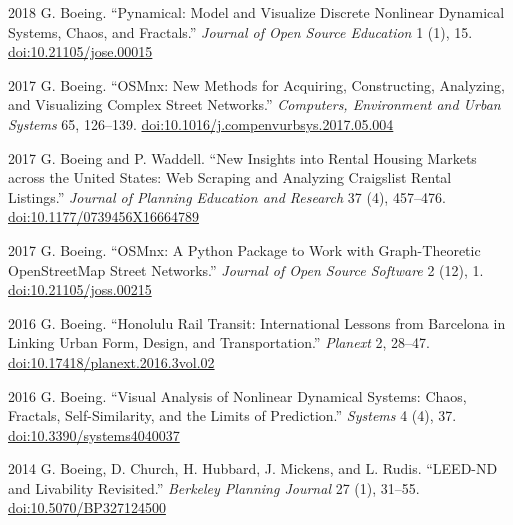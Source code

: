 \documentclass[11pt,letterpaper]{report} %
\begin{document}
\begin{tablist}
        \item[2018] \tab{}G. Boeing. \enquote{Pynamical: Model and Visualize Discrete Nonlinear Dynamical Systems, Chaos, and Fractals.} \textit{Journal of Open Source Education} 1 (1), 15. \href{https://doi.org/10.21105/jose.00015}{doi:10.21105/jose.00015}

        \item[2017] \tab{}G. Boeing. \enquote{OSMnx: New Methods for Acquiring, Constructing, Analyzing, and Visualizing Complex Street Networks.} \textit{Computers, Environment and Urban Systems} 65, 126--139. \href{https://doi.org/10.1016/j.compenvurbsys.2017.05.004}{doi:10.1016/j.compenvurbsys.2017.05.004}

        \item[2017] \tab{}G. Boeing and P. Waddell. \enquote{New Insights into Rental Housing Markets across the United States: Web Scraping and Analyzing Craigslist Rental Listings.} \textit{Journal of Planning Education and Research} 37 (4), 457--476. \href{https://doi.org/10.1177/0739456X16664789}{doi:10.1177/0739456X16664789}

        \item[2017] \tab{}G. Boeing. \enquote{OSMnx: A Python Package to Work with Graph-Theoretic OpenStreetMap Street Networks.} \textit{Journal of Open Source Software} 2 (12), 1. \href{https://doi.org/10.21105/joss.00215}{doi:10.21105/joss.00215}

        \item[2016] \tab{}G. Boeing. \enquote{Honolulu Rail Transit: International Lessons from Barcelona in Linking Urban Form, Design, and Transportation.} \textit{Planext} 2, 28--47. \href{https://doi.org/10.17418/planext.2016.3vol.02}{doi:10.17418/planext.2016.3vol.02}

        \item[2016] \tab{}G. Boeing. \enquote{Visual Analysis of Nonlinear Dynamical Systems: Chaos, Fractals, Self-Similarity, and the Limits of Prediction.} \textit{Systems} 4 (4), 37. \href{https://doi.org/10.3390/systems4040037}{doi:10.3390/systems4040037}

        \item[2014] \tab{}G. Boeing, D. Church, H. Hubbard, J. Mickens, and L. Rudis. \enquote{LEED-ND and Livability Revisited.} \textit{Berkeley Planning Journal} 27 (1), 31--55. \href{https://doi.org/10.5070/BP327124500}{doi:10.5070/BP327124500}

    \end{tablist}
\end{document}
